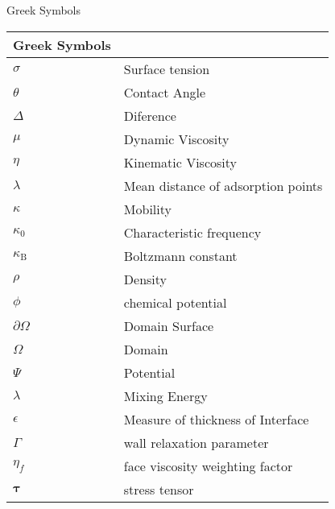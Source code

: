 Greek Symbols
\begin{table}[h]
    \begin{tabular}{ll}
        Greek Symbols & ~ \\ \hline
        $\sigma$ &  Surface tension     \\ \hline
        $\theta$ &  Contact Angle       \\ \hline
        $\Delta$ &  Diference           \\ \hline
        $\mu$       &       Dynamic Viscosity                   \\ \hline
        $\eta$      &       Kinematic Viscosity                 \\ \hline
        $\lambda$   &       Mean distance of adsorption points  \\ \hline
        $\kappa$    &       Mobility                            \\ \hline
        $\kappa_0$  &       Characteristic frequency            \\ \hline
        $\kappa_\mathrm{B}$ & Boltzmann constant                \\ \hline
        $\rho$              & Density                           \\ \hline
        $\phi$              & chemical potential                \\ \hline
        $\partial\Omega$    & Domain Surface                    \\ \hline
        $\Omega$            & Domain                            \\ \hline
        $\Psi$              & Potential                         \\ \hline
        $\lambda$           & Mixing Energy                     \\ \hline
        $\epsilon$          & Measure of thickness of Interface \\ \hline
        $\Gamma$            & wall relaxation parameter         \\ \hline
        $\eta_f$            & face viscosity weighting factor   \\ \hline
        $\mathbf{\tau}$     & stress tensor                     \   \
    \end{tabular}
\end{table}


